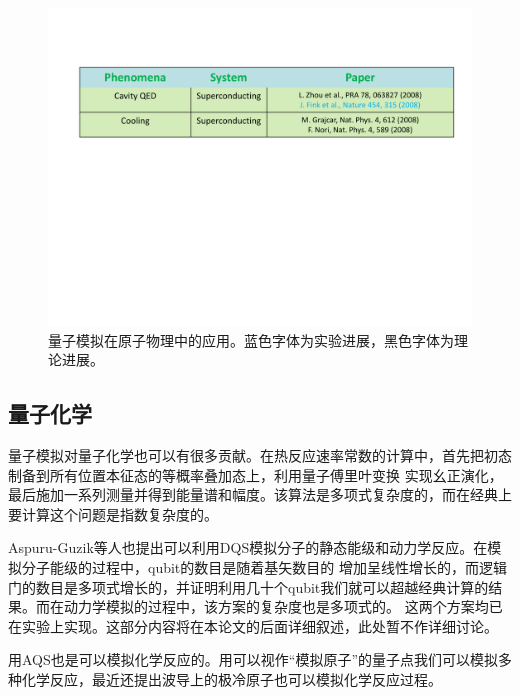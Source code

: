 \begin{figure}[htbp]
            \begin{center}
              \includegraphics[width= 0.8\columnwidth]{figures/atomsim.pdf}
              \caption{量子模拟在原子物理中的应用。蓝色字体为实验进展，黑色字体为理论进展。
              }
              \label{atomsim}
            \end{center}
\end{figure}


 \subsection{量子化学}

量子模拟对量子化学也可以有很多贡献\cite{chem1}。在热反应速率常数的计算中\cite{chem2}，首先把初态制备到所有位置本征态的等概率叠加态上，利用量子傅里叶变换
实现幺正演化，最后施加一系列测量并得到能量谱和幅度。该算法是多项式复杂度的，而在经典上要计算这个问题是指数复杂度的。

Aspuru-Guzik等人也提出可以利用DQS模拟分子的静态能级\cite{Alan_first}和动力学反应\cite{Polynomial_time_algorithm}。在模拟分子能级的过程中，qubit的数目是随着基矢数目的
增加呈线性增长的，而逻辑门的数目是多项式增长的，并证明利用几十个qubit我们就可以超越经典计算的结果。而在动力学模拟的过程中，该方案的复杂度也是多项式的。
这两个方案均已在实验上实现\cite{optics_static,static,dynamical}。这部分内容将在本论文的后面详细叙述，此处暂不作详细讨论。

用AQS也是可以模拟化学反应的。用可以视作“模拟原子”的量子点我们可以模拟多种化学反应\cite{reaction}，最近还提出波导上的极冷原子也可以模拟化学反应过程\cite{chem3}。

